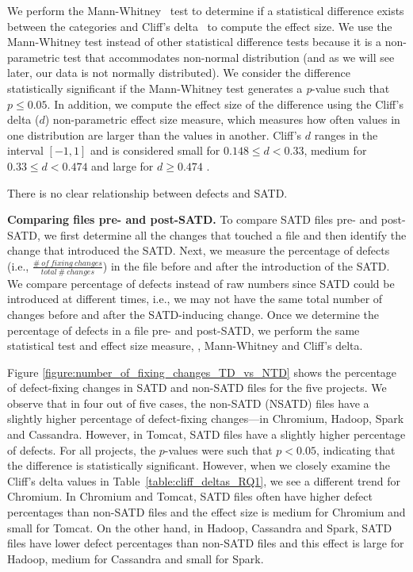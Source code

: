 We perform the Mann-Whitney~\cite{mann1947test} test to determine if a statistical difference exists between the categories and Cliff's delta~\cite{Cliff:2005} to compute the effect size. We use the Mann-Whitney test instead of other statistical difference tests because it is a non-parametric test that accommodates non-normal distribution (and as we will see later, our data is not normally distributed). We consider the difference statistically significant if the Mann-Whitney test generates a \textit{p}-value such that $p \le 0.05$. In addition, we compute the effect size of the difference using the Cliff's delta ($d$) non-parametric effect size measure, which measures how often values in one distribution are larger than the values in another. Cliff's $d$ ranges in  the interval $[-1,1]$ and is considered small for $0.148 \le d < 0.33$, medium for $0.33 \le d < 0.474$ and large for $d \ge 0.474$ \cite{grissom2005effect}.

\begin{myboxii}
	There is no clear relationship between defects and SATD.
\end{myboxii}

\noindent\textbf{Comparing files pre- and post-SATD.} To compare SATD files pre- and post-SATD, we first determine all the changes that touched a file and then identify the change that introduced the SATD. Next, we measure the percentage of defects (i.e., $\frac{\#~of~fixing~changes}{total~\#~changes}$) in the file before and after the introduction of the SATD. We compare percentage of defects instead of raw numbers since SATD could be introduced at different times, i.e., we may not have the same total number of changes before and after the SATD-inducing change. Once we determine the percentage of defects in a file pre- and post-SATD, we perform the same statistical test and effect size measure, \ie{}, Mann-Whitney and Cliff's delta.


 Figure \ref{figure:number_of_fixing_changes_TD_vs_NTD} shows the percentage of defect-fixing changes in SATD and non-SATD files for the five projects. We observe that in four out of five cases, the non-SATD (NSATD) files have a slightly higher percentage of defect-fixing changes---in Chromium, Hadoop, Spark and Cassandra. However, in Tomcat, SATD files have a slightly higher percentage of defects. For all projects, the $p$-values were such that $p < 0.05$, indicating that the difference is statistically significant. However, when we closely examine the Cliff's delta values in Table~\ref{table:cliff_deltas_RQ1}, we see a different trend for Chromium. In Chromium and Tomcat, SATD files often have higher defect percentages than non-SATD files and the effect size is medium for Chromium and small for Tomcat. On the other hand, in Hadoop, Cassandra and Spark, SATD files have lower defect percentages than non-SATD files and this effect is large for Hadoop, medium for Cassandra and small for Spark.

